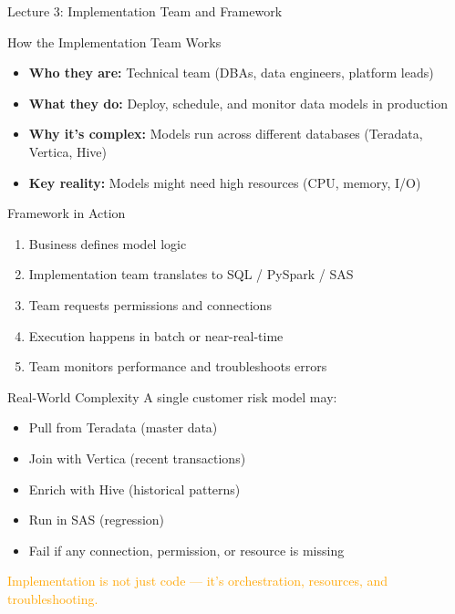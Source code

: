 \documentclass{beamer}
\begin{document}
	
	\begin{frame}{Lecture 3: Implementation Team and Framework}
		\begin{block}{How the Implementation Team Works}
			\begin{itemize}
				\item \textbf{Who they are:} Technical team (DBAs, data engineers, platform leads)
				\item \textbf{What they do:} Deploy, schedule, and monitor data models in production
				\item \textbf{Why it's complex:} Models run across different databases (Teradata, Vertica, Hive)
				\item \textbf{Key reality:} Models might need high resources (CPU, memory, I/O)
			\end{itemize}
		\end{block}
		
		\begin{alertblock}{Framework in Action}
			\begin{enumerate}
				\small
				\item Business defines model logic
				\item Implementation team translates to SQL / PySpark / SAS
				\item Team requests permissions and connections
				\item Execution happens in batch or near-real-time
				\item Team monitors performance and troubleshoots errors
			\end{enumerate}
		\end{alertblock}
		
		\begin{example}{Real-World Complexity}
			A single customer risk model may:
			\begin{itemize}
				\tiny
				\item Pull from Teradata (master data)
				\item Join with Vertica (recent transactions)
				\item Enrich with Hive (historical patterns)
				\item Run in SAS (regression)
				\item Fail if any connection, permission, or resource is missing
			\end{itemize}
		\end{example}
		
		\begin{center}
			\textcolor{orange}{Implementation is not just code — it's orchestration, resources, and troubleshooting.}
		\end{center}
	\end{frame}
	
\end{document}
